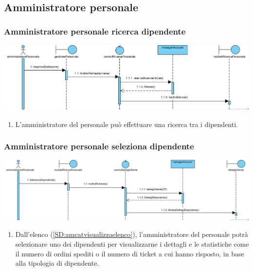 \documentclass[12pt]{article}
\begin{document}
\newpage

\subsection{Amministratore personale}
\subsubsection{Amministratore personale ricerca dipendente}
\label{SD:amperricerca}
\begin{center}
\includegraphics[width=\textwidth]{SequenceDiagram/AmministratorePersonaleDipendenteRicerca}
\end{center}

\begin{enumerate}
\item L'amministratore del personale può effettuare una ricerca tra i dipendenti.
\end{enumerate}

\subsubsection{Amministratore personale seleziona dipendente}
\label{SD:amperselezione}
\begin{center}
\includegraphics[width=\textwidth]{SequenceDiagram/AmministratorePersonaleDipendenteSeleziona}
\end{center}

\begin{enumerate}
\item Dall'elenco (\ref{SD:amcatvisualizzaelenco}), l'amministratore del personale potrà selezionare uno dei dipendenti per visualizzarne i dettagli e le statistiche come il numero di ordini spediti o il numero di ticket a cui hanno risposto, in base alla tipologia di dipendente.
\end{enumerate}
\end{document}
